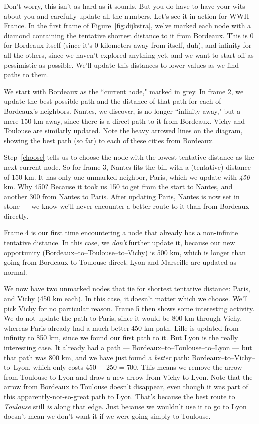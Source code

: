 Don't worry, this isn't as hard as it sounds. But you do have to have your
wits about you and carefully update all the numbers. Let's see it in action
for WWII France. In the first frame of Figure~\ref{fig:dijkstra}, we've marked
each node with a diamond containing the tentative shortest distance to it
from Bordeaux. This is 0 for Bordeaux itself (since it's 0 kilometers away
from itself, duh), and infinity for all the others, since we haven't
explored anything yet, and we want to start off as pessimistic as possible.
We'll update this distances to lower values as we find paths to them.

We start with Bordeaux as the ``current node," marked in grey. In frame 2,
we update the best-possible-path and the distance-of-that-path for each of
Bordeaux's neighbors. Nantes, we discover, is no longer ``infinity away,"
but a mere 150 km away, since there is a direct path to it from Bordeaux.
Vichy and Toulouse are similarly updated. Note the heavy arrowed lines on
the diagram, showing the best path (so far) to each of these cities from
Bordeaux. 

Step~\ref{choose} tells us to choose the node with the lowest tentative
distance as the next current node. So for frame 3, Nantes fits the bill
with a (tentative) distance of 150 km. It has only one unmarked neighbor,
Paris, which we update with \textit{450} km. Why 450? Because it took us
150 to get from the start to Nantes, and another 300 from Nantes to Paris.
After updating Paris, Nantes is now set in stone --- we know we'll never
encounter a better route to it than from Bordeaux directly.

Frame 4 is our first time encountering a node that already has a
non-infinite tentative distance. In this case, we \textit{don't} further
update it, because our new opportunity (Bordeaux--to--Toulouse--to--Vichy)
is 500 km, which is longer than going from Bordeaux to Toulouse direct.
Lyon and Marseille are updated as normal.

We now have two unmarked nodes that tie for shortest tentative distance:
Paris, and Vichy (450 km each). In this case, it doesn't matter which we
choose. We'll pick Vichy for no particular reason. Frame 5 then shows some
interesting activity. We do not update the path to Paris, since it would be
800 km through Vichy, whereas Paris already had a much better 450 km path.
Lille is updated from infinity to 850 km, since we found our first path to
it. But Lyon is the really interesting case. It already had a path ---
Bordeaux--to--Toulouse--to--Lyon --- but that path was 800 km, and we have
just found a \textit{better} path: Bordeaux--to--Vichy--to--Lyon, which
only costs 450 + 250 = 700. This means we remove the arrow from Toulouse to
Lyon and draw a new arrow from Vichy to Lyon. Note that the arrow from
Bordeaux to Toulouse doesn't disappear, even though it was part of this
apparently-not-so-great path to Lyon. That's because the best route to
\textit{Toulouse} still \textit{is} along that edge. Just because we
wouldn't use it to go to Lyon doesn't mean we don't want it if we were
going simply to Toulouse.

